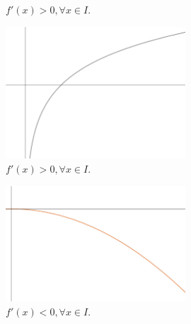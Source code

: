 \documentclass{article}
\begin{document}
{\begin{newpage}
\begin{figure}[htbp]
\begin{center}
\end{center}
\caption{$f'(x)>0, \forall x\in I$.}
\end{figure}

\begin{figure}[htbp]
\begin{center}
\includegraphics[width=0.6\textwidth, angle=0]{Grafico3.png}
\end{center}
\caption{$f'(x)>0, \forall x\in I$.}
\end{figure}

\begin{figure}[htbp]
\begin{center}
\includegraphics[width=0.6\textwidth, angle=0]{Grafico4.png}
\end{center}
\caption{$f'(x)<0, \forall x\in I$.}
\end{figure}



\end{newpage}}
\end{document}
